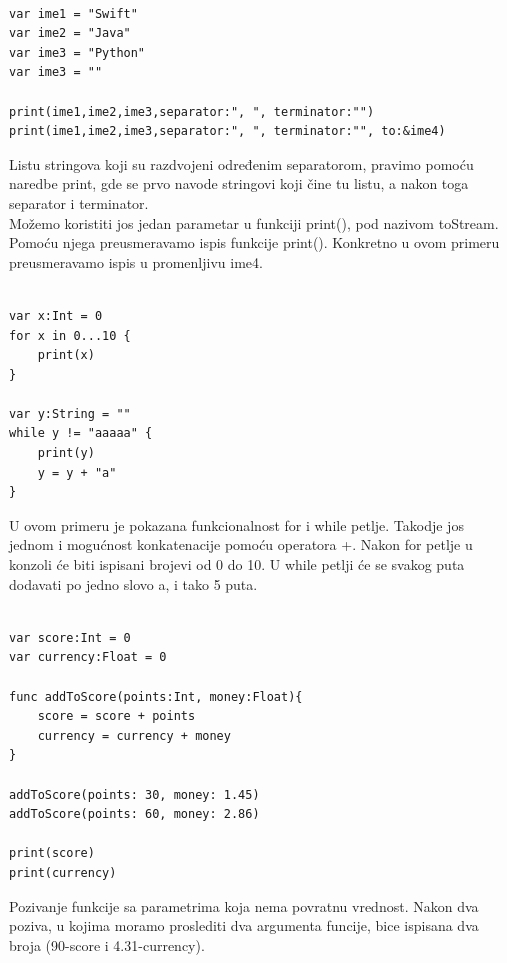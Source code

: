 \documentclass[a4paper]{article}
\begin{document}
\begin{lstlisting}[caption={},frame=single, label=simple]

var ime1 = "Swift"
var ime2 = "Java"
var ime3 = "Python"
var ime3 = ""

print(ime1,ime2,ime3,separator:", ", terminator:"")
print(ime1,ime2,ime3,separator:", ", terminator:"", to:&ime4)

\end{lstlisting}

Listu stringova koji su razdvojeni određenim separatorom, pravimo pomoću naredbe print, gde se prvo navode stringovi koji čine tu listu, a nakon toga separator i terminator.\\
Možemo koristiti jos jedan parametar u funkciji print(), pod nazivom toStream. Pomoću njega preusmeravamo ispis funkcije print(). Konkretno u ovom primeru preusmeravamo ispis u promenljivu ime4.\\


\begin{lstlisting}[caption={},frame=single, label=simple]

var x:Int = 0
for x in 0...10 {
	print(x)
}

var y:String = ""
while y != "aaaaa" {
	print(y)
	y = y + "a"
}

\end{lstlisting}

U ovom primeru je pokazana funkcionalnost for i while petlje. Takodje jos jednom i mogućnost konkatenacije pomoću operatora +. Nakon for petlje u konzoli će biti ispisani brojevi od 0 do 10. U while petlji će se svakog puta dodavati po jedno slovo a, i tako 5 puta.


\begin{lstlisting}[caption={},frame=single, label=simple]

var score:Int = 0
var currency:Float = 0

func addToScore(points:Int, money:Float){
	score = score + points
	currency = currency + money
}

addToScore(points: 30, money: 1.45)
addToScore(points: 60, money: 2.86)

print(score)
print(currency)

\end{lstlisting}

Pozivanje funkcije sa parametrima koja nema povratnu vrednost. Nakon dva poziva, u kojima moramo proslediti dva argumenta funcije, bice ispisana dva broja (90-score i 4.31-currency).\\
\end{document}
